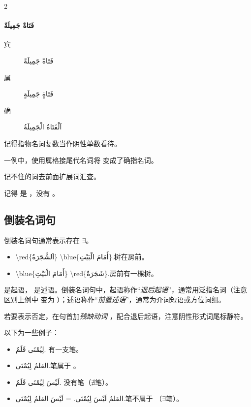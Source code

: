 \begin{Arabic}
\begin{multicols}{2}
    \begin{minipage}{\linewidth}
    \paragraph{فَتَاةٌ جَمِيلَةٌ}
    \begin{description}
        \item [宾] فَتَاةً جَمِيلَةً
        \item [属] فَتَاةٍ جَمِيلَةٍ
        \item [确] اَلْفَتَاةُ الْجَمِيلَةُ 
    \end{description}
    \end{minipage}
    \end{multicols}
\end{Arabic}


\begin{attention}
    记得指物名词复数当作阴性单数看待。

     一例中，使用属格接尾代名词将  变成了确指名词。
\end{attention}

\begin{note}
    记不住的词去前面扩展词汇查。

    记得  是  ，没有 。
\end{note}

\subsection{ 倒装名词句}

倒装名词句通常表示存在 $\exists$。

\begin{itemize}
    \item \ac{\red{اَلشَّجَرَةُ} \blue{أَمَامَ الْبَيْتِ}.}{树在房前。}
    \item \ac{\blue{أَمَامَ الْبَيْتِ} \red{شَجَرَةٌ}.}{房前有一棵树。}
\end{itemize}

 是起语， 是述语。倒装名词句中，起语称作``\emph{退后起语}''，通常用泛指名词（注意区别上例中  变为 ）；述语称作``\emph{前置述语}''，通常为介词短语或方位词组。

若要表示否定，在句首加\emph{残缺动词}  ，配合退后起语，注意阴性形式词尾标静符。

以下为一些例子：

\begin{itemize}
    \item \ac{لِيُمْنَى قَلَمٌ.}{ 有一支笔。}
    \item \ac{القلمُ لِيُمْنَى.}{笔属于 。}
    \item \ac{لَيْسَ لِيُمْنَى قَلَمٌ.}{ 没有笔（$\nexists$笔）。}
    \item \ac{القلمُ لَيْسَ لِيُمْنَى. = لَيْسَ القلمُ لِيُمْنَى.}{笔不属于 （$\exists$笔）。}
\end{itemize}

